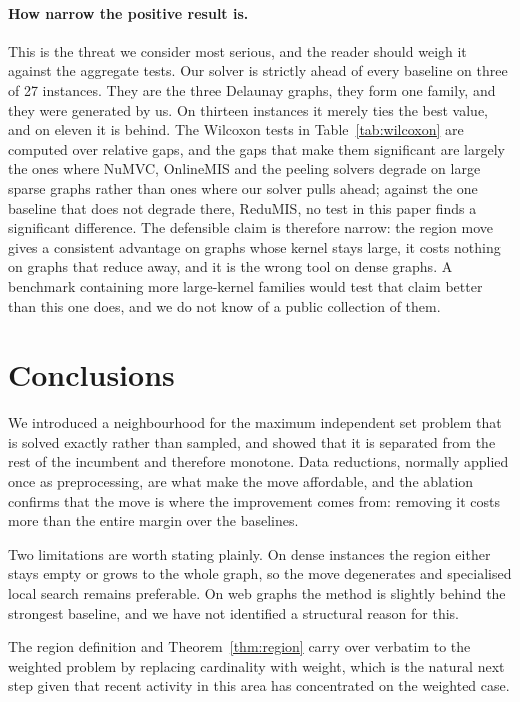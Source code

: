 \documentclass[preprint,12pt]{elsarticle}
\theoremstyle{definition}
\begin{document}
\paragraph{How narrow the positive result is.} This is the threat we consider
most serious, and the reader should weigh it against the aggregate tests. Our
solver is strictly ahead of every baseline on three of 27 instances. They are
the three Delaunay graphs, they form one family, and they were generated by us.
On thirteen instances it merely ties the best value, and on eleven it is behind.
The Wilcoxon tests in Table~\ref{tab:wilcoxon} are computed over relative gaps,
and the gaps that make them significant are largely the ones where NuMVC,
OnlineMIS and the peeling solvers degrade on large sparse graphs rather than
ones where our solver pulls ahead; against the one baseline that does not
degrade there, ReduMIS, no test in this paper finds a significant difference.
The defensible claim is therefore narrow: the region move gives a consistent
advantage on graphs whose kernel stays large, it costs nothing on graphs that
reduce away, and it is the wrong tool on dense graphs. A benchmark containing
more large-kernel families would test that claim better than this one does, and
we do not know of a public collection of them.

\section{Conclusions}
\label{sec:conclusions}

We introduced a neighbourhood for the maximum independent set problem that is
solved exactly rather than sampled, and showed that it is separated from the rest
of the incumbent and therefore monotone. Data reductions, normally applied once
as preprocessing, are what make the move affordable, and the ablation confirms
that the move is where the improvement comes from: removing it costs more than
the entire margin over the baselines.

Two limitations are worth stating plainly. On dense instances the region either
stays empty or grows to the whole graph, so the move degenerates and specialised
local search remains preferable. On web graphs the method is slightly behind the
strongest baseline, and we have not identified a structural reason for this.

The region definition and Theorem~\ref{thm:region} carry over verbatim to the
weighted problem by replacing cardinality with weight, which is the natural next
step given that recent activity in this area has concentrated on the weighted
case.
\end{document}
